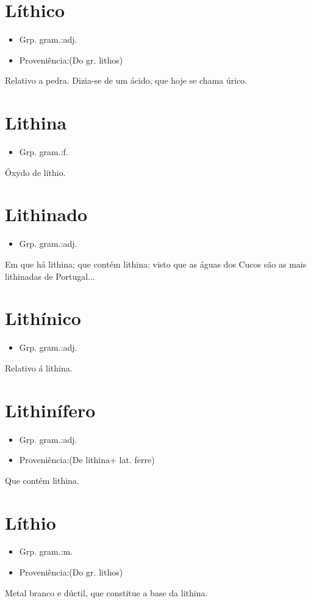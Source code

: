 \section{Líthico}
\begin{itemize}
\item {Grp. gram.:adj.}
\end{itemize}
\begin{itemize}
\item {Proveniência:(Do gr. \textunderscore lithos\textunderscore )}
\end{itemize}
Relativo a pedra.
Dizia-se de um ácido, que hoje se chama \textunderscore úrico\textunderscore .
\section{Lithina}
\begin{itemize}
\item {Grp. gram.:f.}
\end{itemize}
Óxydo de líthio.
\section{Lithinado}
\begin{itemize}
\item {Grp. gram.:adj.}
\end{itemize}
Em que há lithina; que contém lithina: \textunderscore visto que as águas dos Cucos são as mais lithinadas de Portugal...\textunderscore 
\section{Lithínico}
\begin{itemize}
\item {Grp. gram.:adj.}
\end{itemize}
Relativo á lithina.
\section{Lithinífero}
\begin{itemize}
\item {Grp. gram.:adj.}
\end{itemize}
\begin{itemize}
\item {Proveniência:(De \textunderscore lithina\textunderscore  + lat. \textunderscore ferre\textunderscore )}
\end{itemize}
Que contém lithina.
\section{Líthio}
\begin{itemize}
\item {Grp. gram.:m.}
\end{itemize}
\begin{itemize}
\item {Proveniência:(Do gr. \textunderscore lithos\textunderscore )}
\end{itemize}
Metal branco e dúctil, que constitue a base da lithina.
